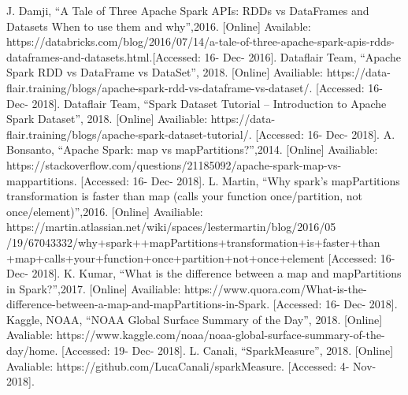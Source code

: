 \documentclass[conference]{IEEEtran}
\begin{document}
\begin{thebibliography}{00}
 J. Damji, ``A Tale of Three Apache Spark APIs: RDDs vs DataFrames and Datasets
When to use them and why'',2016. [Online] Available: https://databricks.com/blog/2016/07/14/a-tale-of-three-apache-spark-apis-rdds-dataframes-and-datasets.html.[Accessed: 16- Dec- 2016].
 Dataflair Team, ``Apache Spark RDD vs DataFrame vs DataSet'', 2018. [Online] Availiable: https://data-flair.training/blogs/apache-spark-rdd-vs-dataframe-vs-dataset/. [Accessed: 16- Dec- 2018].
 Dataflair Team, ``Spark Dataset Tutorial – Introduction to Apache Spark Dataset'', 2018. [Online] Availiable: https://data-flair.training/blogs/apache-spark-dataset-tutorial/. [Accessed: 16- Dec- 2018].
 A. Bonsanto, ``Apache Spark: map vs mapPartitions?'',2014. [Online] Availiable: https://stackoverflow.com/questions/21185092/apache-spark-map-vs-mappartitions. [Accessed: 16- Dec- 2018].
 L. Martin, ``Why spark's mapPartitions transformation is 
faster than map (calls your function once/partition, not once/element)'',2016. [Online] Availiable: https://martin.atlassian.net/wiki/spaces/lestermartin/blog/2016/05
/19/67043332/why+spark++mapPartitions+transformation+is+faster+than
+map+calls+your+function+once+partition+not+once+element [Accessed: 16- Dec- 2018].
 K. Kumar, ``What is the difference between a map and mapPartitions in Spark?'',2017. [Online] Availiable: https://www.quora.com/What-is-the-difference-between-a-map-and-mapPartitions-in-Spark. [Accessed: 16- Dec- 2018].
 Kaggle, NOAA, ``NOAA Global Surface Summary of the Day'', 2018. [Online] Avaliable: 
https://www.kaggle.com/noaa/noaa-global-surface-summary-of-the-day/home. [Accessed: 19- Dec- 2018].
 L. Canali, ``SparkMeasure'', 2018. [Online] Avaliable: https://github.com/LucaCanali/sparkMeasure. [Accessed: 4- Nov- 2018].

\end{thebibliography}
\vspace{12pt}
\end{document}
